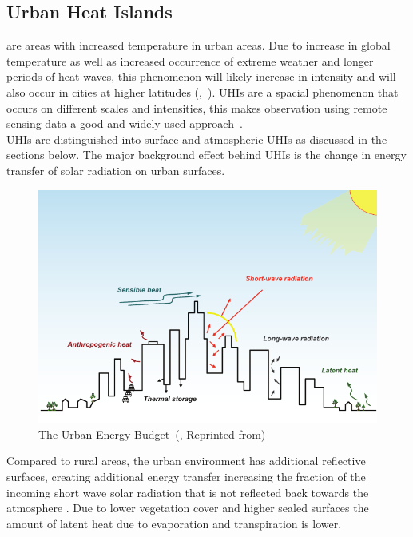 \documentclass[12pt,a4paper, english,twoside]{scrartcl}
\begin{document}
  \subsection{Urban Heat Islands}\label{sec:uhi}
     are areas with increased temperature in urban areas.
    Due to increase in global temperature as well as increased occurrence of extreme weather and longer periods of heat waves, this phenomenon will likely increase in intensity and will also occur in cities at higher latitudes (\cite{Sachindra2016},~\cite[p.~904]{Wilby2008}).
    \glspl{UHI} are a spacial phenomenon that occurs on different scales and intensities, this makes observation using remote sensing data a good and widely used approach~\autocite{Weng2003}.\\
    \glspl{UHI} are distinguished into surface and atmospheric \glspl{UHI} as discussed in the sections below. 
    The major background effect behind \glspl{UHI} is the change in energy transfer of solar radiation on urban surfaces. 
    \begin{figure}[htbp]
      \begin{center}
        \includegraphics[width=\textwidth]{img/radiationBudget.png}
      \end{center}
      \caption{The Urban Energy Budget~(, Reprinted from\cite[Fig. 7]{EPA2008}\label{fig:radiationbudget})}
    \end{figure}
    Compared to rural areas, the urban environment has additional reflective surfaces, creating additional energy transfer increasing the fraction of the incoming short wave solar radiation that is not reflected back towards the atmosphere \autocite[p.12]{EPA2008}. 
    Due to lower vegetation cover and higher sealed surfaces the amount of latent heat due to evaporation and transpiration is lower.
\end{document}
